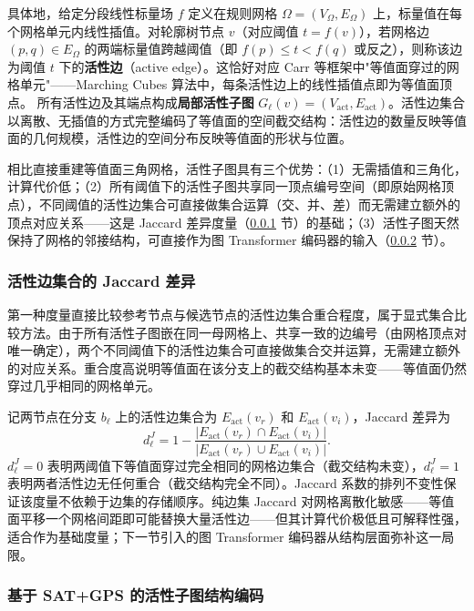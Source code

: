 \documentclass[twocolumn, a4paper, 10pt]{article}
\begin{document}
具体地，给定分段线性标量场 $f$ 定义在规则网格 $\Omega=(V_\Omega, E_\Omega)$ 上，标量值在每个网格单元内线性插值。对轮廓树节点 $v$（对应阈值 $t=f(v)$），若网格边 $(p,q)\in E_\Omega$ 的两端标量值跨越阈值（即 $f(p)\leq t < f(q)$ 或反之），则称该边为阈值 $t$ 下的\textbf{活性边}（active edge）。这恰好对应 Carr 等框架中"等值面穿过的网格单元"——Marching Cubes 算法中，每条活性边上的线性插值点即为等值面顶点。\cite{carr_flexible_2010} 所有活性边及其端点构成\textbf{局部活性子图} $G_\ell(v)=(V_{\mathrm{act}},E_{\mathrm{act}})$。活性边集合以离散、无插值的方式完整编码了等值面的空间截交结构：活性边的数量反映等值面的几何规模，活性边的空间分布反映等值面的形状与位置。

相比直接重建等值面三角网格，活性子图具有三个优势：（1）无需插值和三角化，计算代价低；（2）所有阈值下的活性子图共享同一顶点编号空间（即原始网格顶点），不同阈值的活性边集合可直接做集合运算（交、并、差）而无需建立额外的顶点对应关系——这是 Jaccard 差异度量（\ref{sec:jaccard} 节）的基础；（3）活性子图天然保持了网格的邻接结构，可直接作为图 Transformer 编码器的输入（\ref{sec:gnn} 节）。

\subsubsection{活性边集合的 Jaccard 差异}
\label{sec:jaccard}

第一种度量直接比较参考节点与候选节点的活性边集合重合程度，属于显式集合比较方法。由于所有活性子图嵌在同一母网格上、共享一致的边编号（由网格顶点对唯一确定），两个不同阈值下的活性边集合可直接做集合交并运算，无需建立额外的对应关系。重合度高说明等值面在该分支上的截交结构基本未变——等值面仍然穿过几乎相同的网格单元。

记两节点在分支 $b_\ell$ 上的活性边集合为 $E_{\mathrm{act}}(v_r)$ 和 $E_{\mathrm{act}}(v_i)$，Jaccard 差异为
\begin{equation}
d^{J}_\ell=1-\frac{|E_{\mathrm{act}}(v_r)\cap E_{\mathrm{act}}(v_i)|}{|E_{\mathrm{act}}(v_r)\cup E_{\mathrm{act}}(v_i)|}.
\label{eq:jaccard}
\end{equation}
$d^J_\ell=0$ 表明两阈值下等值面穿过完全相同的网格边集合（截交结构未变），$d^J_\ell=1$ 表明两者活性边无任何重合（截交结构完全不同）。Jaccard 系数的排列不变性保证该度量不依赖于边集的存储顺序。纯边集 Jaccard 对网格离散化敏感——等值面平移一个网格间距即可能替换大量活性边——但其计算代价极低且可解释性强，适合作为基础度量；下一节引入的图 Transformer 编码器从结构层面弥补这一局限。

\subsubsection{基于 SAT+GPS 的活性子图结构编码}
\label{sec:gnn}
\end{document}
